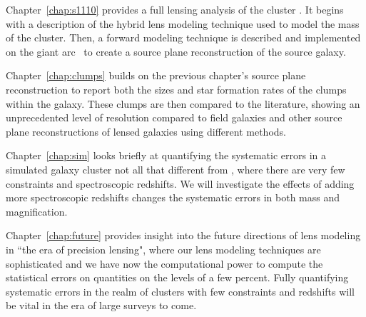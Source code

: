 Chapter~\ref{chap:s1110} provides a full lensing analysis of the cluster \cluster. It begins with a description of the hybrid lens modeling technique used to model the mass of the cluster. Then, a forward modeling technique is described and implemented on the giant arc \giantarc\ to create a source plane reconstruction of the source galaxy.

Chapter~\ref{chap:clumps} builds on the previous chapter's source plane reconstruction to report both the sizes and star formation rates of the clumps within the galaxy. These clumps are then compared to the literature, showing an unprecedented level of resolution compared to field galaxies and other source plane reconstructions of lensed galaxies using different methods.

Chapter~\ref{chap:sim} looks briefly at quantifying the systematic errors in a simulated galaxy cluster not all that different from \cluster, where there are very few constraints and spectroscopic redshifts. We will investigate the effects of adding more spectroscopic redshifts changes the systematic errors in both mass and magnification.

Chapter~\ref{chap:future} provides insight into the future directions of lens modeling in ``the era of precision lensing", where our lens modeling techniques are sophisticated and we have now the computational power to compute the statistical errors on quantities on the levels of a few percent. Fully quantifying systematic errors in the realm of clusters with few constraints and redshifts will be vital in the era of large surveys to come.







